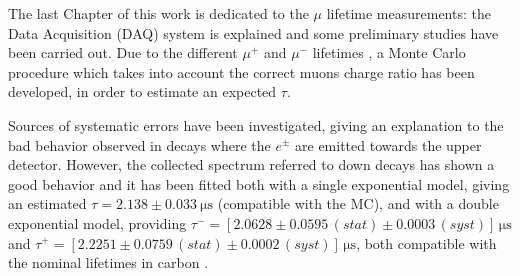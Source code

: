 The last Chapter of this work is dedicated to the $\mu$ lifetime measurements: the Data Acquisition (DAQ) system is explained and some preliminary studies have been carried out. Due to the different $\mu^+$ and $\mu^-$ lifetimes \cite{lifetime}, a Monte Carlo procedure which takes into account the correct muons charge ratio \cite{charge} has been developed, in order to estimate an expected $\tau$.

Sources of systematic errors have been investigated, giving an explanation to the bad behavior observed in decays where the $e^\pm$ are emitted towards the upper detector. However, the collected spectrum referred to down decays has shown a good behavior and it has been fitted both with a single exponential model, giving an estimated $\tau = 2.138\pm \SI{0.033}{\micro\second}$ (compatible with the MC), and with a double exponential model, providing $\tau^- = \left[2.0628 \pm 0.0595\,(stat) \pm 0.0003\,(syst)\right]\,\si{\micro\second}$ and $\tau^+ = \left[2.2251 \pm 0.0759\,(stat) \pm 0.0002\,(syst)\right]\,\si{\micro\second}$, both compatible with the nominal lifetimes in carbon \cite{lifetime}.

